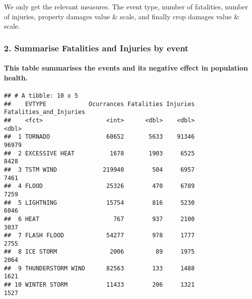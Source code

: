 \documentclass[]{article}
\newenvironment{Shaded}{\begin{snugshade}}{\end{snugshade}}
\newcommand{\KeywordTok}[1]{\textcolor[rgb]{0.13,0.29,0.53}{\textbf{#1}}}
\newcommand{\DataTypeTok}[1]{\textcolor[rgb]{0.13,0.29,0.53}{#1}}
\newcommand{\DecValTok}[1]{\textcolor[rgb]{0.00,0.00,0.81}{#1}}
\newcommand{\StringTok}[1]{\textcolor[rgb]{0.31,0.60,0.02}{#1}}
\newcommand{\OperatorTok}[1]{\textcolor[rgb]{0.81,0.36,0.00}{\textbf{#1}}}
\newcommand{\NormalTok}[1]{#1}
\let\oldparagraph\paragraph
\renewcommand{\paragraph}[1]{\oldparagraph{#1}\mbox{}}
\begin{document}
We only get the relevant measures. The event type, number of fatalities,
number of injuries, property damages value \& scale, and finally crop
damages value \& scale.

\subsubsection{2. Summarise Fatalities and Injuries by
event}\label{summarise-fatalities-and-injuries-by-event}

\begin{Shaded}
\end{Shaded}

\paragraph{This table summarises the events and its negative effect in
population
health.}\label{this-table-summarises-the-events-and-its-negative-effect-in-population-health.}

\begin{verbatim}
## # A tibble: 10 x 5
##    EVTYPE            Ocurrances Fatalities Injuries Fatalities_and_Injuries
##    <fct>                  <int>      <dbl>    <dbl>                   <dbl>
##  1 TORNADO                60652       5633    91346                   96979
##  2 EXCESSIVE HEAT          1678       1903     6525                    8428
##  3 TSTM WIND             219940        504     6957                    7461
##  4 FLOOD                  25326        470     6789                    7259
##  5 LIGHTNING              15754        816     5230                    6046
##  6 HEAT                     767        937     2100                    3037
##  7 FLASH FLOOD            54277        978     1777                    2755
##  8 ICE STORM               2006         89     1975                    2064
##  9 THUNDERSTORM WIND      82563        133     1488                    1621
## 10 WINTER STORM           11433        206     1321                    1527
\end{verbatim}
\end{document}
